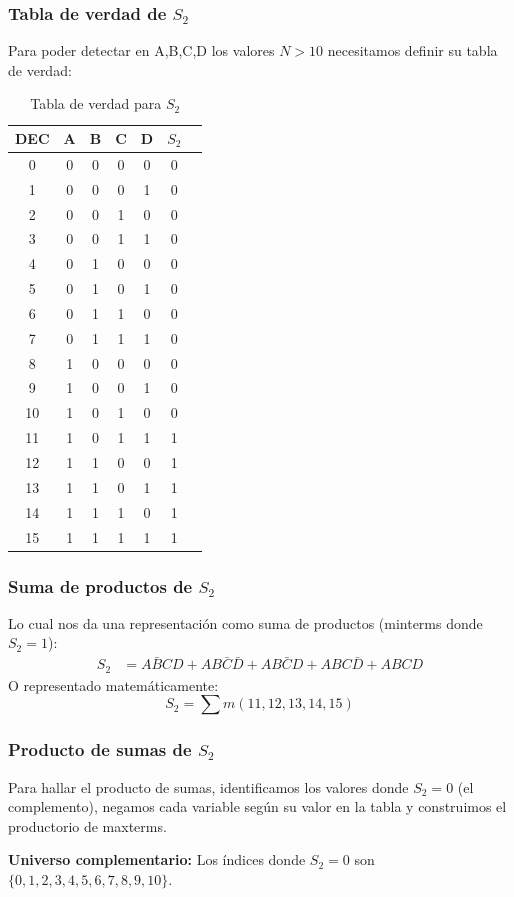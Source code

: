 \documentclass[11pt,a4paper]{article}
\newcommand{\tverdad}[4]{%
  \begin{table}[H]%
  \centering%
  \begin{tabular}{|*{#1}{c|}|*{#2}{c|}}%
    #3%
  \end{tabular}%
  \caption{#4}%
  \end{table}%
}
\begin{document}
\subsubsection*{Tabla de verdad de $S_2$}
Para poder detectar en A,B,C,D los valores $N > 10$ necesitamos definir su tabla de verdad:
\tverdad{6}{1}{%
  \hline
  DEC & A & B & C & D & $S_2$ \\
  \hline
  0  & 0 & 0 & 0 & 0 & 0 \\
  1  & 0 & 0 & 0 & 1 & 0 \\
  2  & 0 & 0 & 1 & 0 & 0 \\
  3  & 0 & 0 & 1 & 1 & 0 \\
  4  & 0 & 1 & 0 & 0 & 0 \\
  5  & 0 & 1 & 0 & 1 & 0 \\
  6  & 0 & 1 & 1 & 0 & 0 \\
  7  & 0 & 1 & 1 & 1 & 0 \\
  8  & 1 & 0 & 0 & 0 & 0 \\
  9  & 1 & 0 & 0 & 1 & 0 \\
  10 & 1 & 0 & 1 & 0 & 0 \\
  11 & 1 & 0 & 1 & 1 & 1 \\
  12 & 1 & 1 & 0 & 0 & 1 \\
  13 & 1 & 1 & 0 & 1 & 1 \\
  14 & 1 & 1 & 1 & 0 & 1 \\
  15 & 1 & 1 & 1 & 1 & 1 \\
  \hline%
}{Tabla de verdad para $S_2$}

\subsubsection*{Suma de productos de $S_2$}
Lo cual nos da una representación como suma de productos (minterms donde $S_2 = 1$):
\begin{align}
S_2 &= A\bar{B}CD + AB\bar{C}\bar{D} + AB\bar{C}D + ABC\bar{D} + ABCD
\end{align}
O representado matemáticamente:
\[S_2 = \sum m(11,12,13,14,15)\]

\subsubsection*{Producto de sumas de $S_2$}
Para hallar el producto de sumas, identificamos los valores donde $S_2 = 0$ (el complemento), negamos cada variable según su valor en la tabla y construimos el productorio de maxterms.

\textbf{Universo complementario:} Los índices donde $S_2 = 0$ son $\{0,1,2,3,4,5,6,7,8,9,10\}$.
\end{document}
